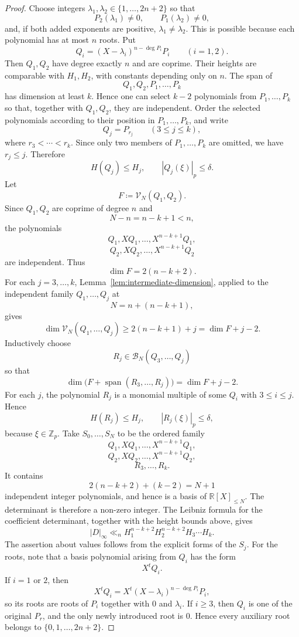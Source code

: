 \documentclass[10pt,a4paper]{amsart}
\newcommand{\R}{\mathbb R}
\newcommand{\Zp}{\mathbb Z_p}
\newcommand{\calB}{\mathcal B}
\newcommand{\calV}{\mathcal V}
\newcommand{\Span}{\operatorname{span}}
\begin{document}
\begin{proof}
Choose integers $\lambda_1,\lambda_2\in\{1,\ldots,2n+2\}$
so that
$$
P_2(\lambda_1)\neq0,
\qquad P_1(\lambda_2)\neq0,
$$
and, if both added exponents are positive, $\lambda_1\neq\lambda_2$. This is possible because each polynomial has at most $n$ roots. Put
$$
Q_i=(X-\lambda_i)^{n-\deg P_i}P_i
\qquad (i=1,2).
$$
Then $Q_1,Q_2$ have degree exactly $n$ and are coprime. Their heights are comparable with $H_1,H_2$, with constants depending only on $n$. The span of
$$
Q_1,Q_2,P_1,\ldots,P_k
$$
has dimension at least $k$. Hence one can select $k-2$ polynomials from
$P_1,\ldots,P_k$ so that, together with $Q_1,Q_2$, they are independent.
Order the selected polynomials according to their position in
$P_1,\ldots,P_k$, and write
$$
Q_j=P_{r_j}\qquad (3\leq j\leq k),
$$
where $r_3<\cdots<r_k$. Since only two members of $P_1,\ldots,P_k$ are
omitted, we have $r_j\leq j$. Therefore
$$
H(Q_j)\leq H_j,
\qquad |Q_j(\xi)|_p\leq\delta.
$$
Let
$$
F\coloneqq\calV_N(Q_1,Q_2).
$$
Since $Q_1,Q_2$ are coprime of degree $n$ and
$$
N-n=n-k+1<n,
$$
the polynomials
$$
Q_1,XQ_1,\ldots,X^{n-k+1}Q_1,
$$
$$
Q_2,XQ_2,\ldots,X^{n-k+1}Q_2
$$
are independent. Thus
$$
\dim F=2(n-k+2).
$$
For each $j=3,\ldots,k$, Lemma~\ref{lem:intermediate-dimension}, applied to the independent family $Q_1,\ldots,Q_j$ at
$$
N=n+(n-k+1),
$$
gives
$$
\dim\calV_N(Q_1,\ldots,Q_j)
\geq2(n-k+1)+j
=\dim F+j-2.
$$
Inductively choose
$$
R_j\in\calB_N(Q_3,\ldots,Q_j)
$$
so that
$$
\dim\bigl(F+\Span(R_3,\ldots,R_j)\bigr)
=\dim F+j-2.
$$
For each $j$, the polynomial $R_j$ is a monomial multiple of some $Q_i$ with $3\leq i\leq j$. Hence
$$
H(R_j)\leq H_j,
\qquad |R_j(\xi)|_p\leq\delta,
$$
because $\xi\in\Zp$. Take  $S_0,\ldots,S_N$ to be the ordered family
$$
Q_1,XQ_1,\ldots,X^{n-k+1}Q_1,
$$
$$
Q_2,XQ_2,\ldots,X^{n-k+1}Q_2,
$$
$$
R_3,\ldots,R_k.
$$
It contains
$$
2(n-k+2)+(k-2)=N+1
$$
independent integer polynomials, and hence is a basis of $\R[X]_{\leq N}$. The determinant is therefore a non-zero integer. The Leibniz formula for the coefficient determinant, together with the height bounds above, gives
$$
|D|_\infty
\ll_n
H_1^{n-k+2}H_2^{n-k+2}H_3\cdots H_k.
$$
The assertion about values follows from the explicit forms of the $S_j$. For the roots, note that a basis polynomial arising from $Q_i$ has the form
$$
X^tQ_i.
$$
If $i=1$ or $2$, then
$$
X^tQ_i
=
X^t(X-\lambda_i)^{n-\deg P_i}P_i,
$$
so its roots are roots of $P_i$ together with $0$ and $\lambda_i$. If
$i\geq3$, then $Q_i$ is one of the original $P_r$, and the only newly
introduced root is $0$. Hence every auxiliary root belongs to
$\{0,1,\ldots,2n+2\}$.
\end{proof}
\end{document}
